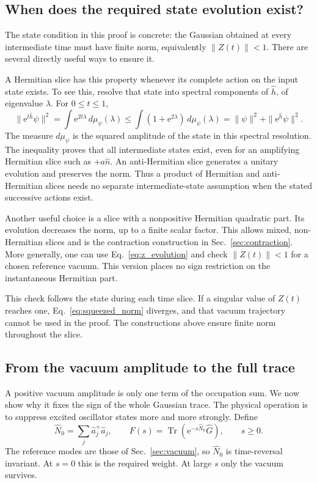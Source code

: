 \documentclass[11pt,a4paper]{article}
\newcommand{\Tr}{\operatorname{Tr}}
\newcommand{\ee}{\mathrm e}
\numberwithin{equation}{section}
\begin{document}
\subsection{When does the required state evolution exist?}
\label{sec:existence}

The state condition in this proof is concrete: the Gaussian obtained at
every intermediate time must have finite norm, equivalently $\|Z(t)\|<1$.
There are several directly useful ways to ensure it.

A Hermitian slice has this property whenever its complete action on the
input state exists. To see this, resolve that state into spectral components
of $\hat h$, of eigenvalue $\lambda$. For $0\leq t\leq1$,
\begin{equation}
 \|\ee^{t\hat h}\psi\|^2
 =\int\ee^{2t\lambda}\,d\mu_\psi(\lambda)
 \leq\int(1+\ee^{2\lambda})\,d\mu_\psi(\lambda)
 =\|\psi\|^2+\|\ee^{\hat h}\psi\|^2.
 \label{eq:hermitian_slice}
\end{equation}
The measure $d\mu_\psi$ is the squared amplitude of the state in this
spectral resolution. The inequality proves that all intermediate states
exist, even for an amplifying Hermitian slice such as $+a\hat n$.
An anti-Hermitian slice generates a unitary evolution and preserves the norm.
Thus a product of Hermitian and anti-Hermitian slices needs no separate
intermediate-state assumption when the stated successive actions exist.

Another useful choice is a slice with a nonpositive Hermitian quadratic part.
Its evolution decreases the norm, up to a finite scalar factor. This allows
mixed, non-Hermitian slices and is the contraction construction in
Sec.~\ref{sec:contraction}. More generally, one can use
Eq.~\eqref{eq:z_evolution} and check $\|Z(t)\|<1$ for a chosen reference
vacuum. This version places no sign restriction on the instantaneous
Hermitian part.

This check follows the state during each time slice. If a singular value of
$Z(t)$ reaches one, Eq.~\eqref{eq:squeezed_norm} diverges, and that vacuum
trajectory cannot be used in the proof. The constructions above ensure
finite norm throughout the slice.

\subsection{From the vacuum amplitude to the full trace}
\label{sec:filter}

A positive vacuum amplitude is only one term of the occupation sum. We now
show why it fixes the sign of the whole Gaussian trace. The physical operation
is to suppress excited oscillator states more and more strongly. Define
\begin{equation}
 \hat N_0=\sum_j\hat a_j^+\hat a_j,
 \qquad F(s)=\Tr\!\left(\ee^{-s\hat N_0}\hat G\right),
 \qquad s\geq0.
 \label{eq:thermal_filter}
\end{equation}
The reference modes are those of Sec.~\ref{sec:vacuum}, so $\hat N_0$ is
time-reversal invariant. At $s=0$ this is the required weight. At large $s$
only the vacuum survives.
\end{document}
